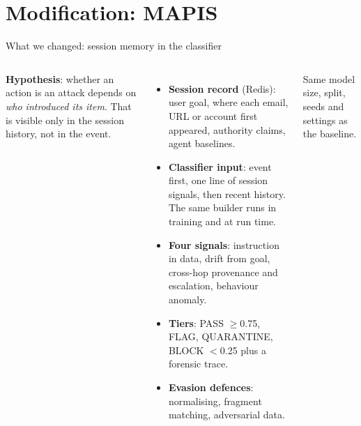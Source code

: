 \documentclass[aspectratio=169,10pt]{beamer}
\begin{document}
\section{Modification: MAPIS}
\begin{frame}{What we changed: session memory in the classifier}
  \begin{columns}[T]
    \small
    \textbf{Hypothesis}: whether an action is an attack depends on \emph{who introduced its item}. That is visible only in the session history, not in the event.
    \begin{itemize}\small
      \item \textbf{Session record} (Redis): user goal, where each email, URL or account first appeared, authority claims, agent baselines.
      \item \textbf{Classifier input}: event first, one line of session signals, then recent history. The same builder runs in training and at run time.
      \item \textbf{Four signals}: instruction in data, drift from goal, cross-hop provenance and escalation, behaviour anomaly.
      \item \textbf{Tiers}: PASS $\ge$0.75, FLAG, QUARANTINE, BLOCK $<$0.25 plus a forensic trace.
      \item \textbf{Evasion defences}: normalising, fragment matching, adversarial data.
    \end{itemize}
    {\scriptsize Same model size, split, seeds and settings as the baseline.}
    \centering
  \end{columns}
\end{frame}
\end{document}
